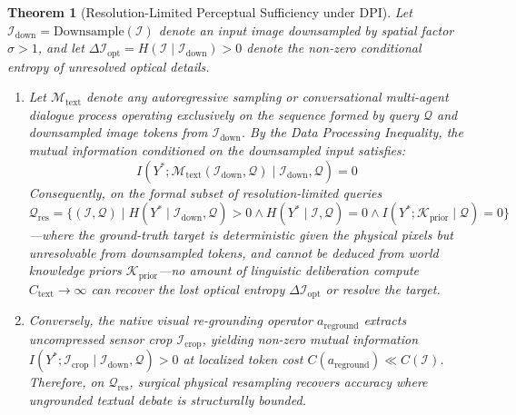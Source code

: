 \documentclass[11pt]{article}
\newtheorem{theorem}{Theorem}
\begin{document}
\begin{theorem}[Resolution-Limited Perceptual Sufficiency under DPI]
\label{thm:dpi}
Let $\mathcal{I}_{\text{down}} = \text{Downsample}(\mathcal{I})$ denote an input image downsampled by spatial factor $\sigma > 1$, and let $\Delta \mathcal{I}_{\text{opt}} = H(\mathcal{I} \mid \mathcal{I}_{\text{down}}) > 0$ denote the non-zero conditional entropy of unresolved optical details.
\begin{enumerate}[label=(\alph*),noitemsep]
    \item Let $\mathcal{M}_{\text{text}}$ denote any autoregressive sampling or conversational multi-agent dialogue process operating exclusively on the sequence formed by query $\mathcal{Q}$ and downsampled image tokens from $\mathcal{I}_{\text{down}}$. By the Data Processing Inequality, the mutual information conditioned on the downsampled input satisfies:
    \begin{equation}
    I(Y^*; \mathcal{M}_{\text{text}}(\mathcal{I}_{\text{down}}, \mathcal{Q}) \mid \mathcal{I}_{\text{down}}, \mathcal{Q}) = 0
    \end{equation}
    Consequently, on the formal subset of resolution-limited queries $\mathcal{Q}_{\text{res}} = \{(\mathcal{I}, \mathcal{Q}) \mid H(Y^* \mid \mathcal{I}_{\text{down}}, \mathcal{Q}) > 0 \land H(Y^* \mid \mathcal{I}, \mathcal{Q}) = 0 \land I(Y^*; \mathcal{K}_{\text{prior}} \mid \mathcal{Q}) = 0\}$---where the ground-truth target is deterministic given the physical pixels but unresolvable from downsampled tokens, and cannot be deduced from world knowledge priors $\mathcal{K}_{\text{prior}}$---no amount of linguistic deliberation compute $C_{\text{text}} \to \infty$ can recover the lost optical entropy $\Delta \mathcal{I}_{\text{opt}}$ or resolve the target.
    \item Conversely, the native visual re-grounding operator $a_{\text{reground}}$ extracts uncompressed sensor crop $\mathcal{I}_{\text{crop}}$, yielding non-zero mutual information $I(Y^*; \mathcal{I}_{\text{crop}} \mid \mathcal{I}_{\text{down}}, \mathcal{Q}) > 0$ at localized token cost $C(a_{\text{reground}}) \ll C(\mathcal{I})$. Therefore, on $\mathcal{Q}_{\text{res}}$, surgical physical resampling recovers accuracy where ungrounded textual debate is structurally bounded.
\end{enumerate}
\end{theorem}
\end{document}
